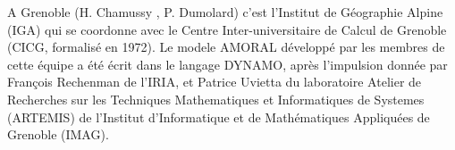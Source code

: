 
A Grenoble (H. Chamussy , P. Dumolard) c’est l’Institut de Géographie Alpine (IGA) qui se coordonne avec le Centre Inter-universitaire de Calcul de Grenoble (CICG, formalisé en 1972). Le modele AMORAL développé par les membres de cette équipe a été écrit dans le langage DYNAMO, après l'impulsion donnée par François Rechenman de l'IRIA, et Patrice Uvietta du laboratoire Atelier de Recherches sur les Techniques Mathematiques et Informatiques de Systemes (ARTEMIS) de l’Institut d'Informatique et de Mathématiques Appliquées de Grenoble (IMAG). %

